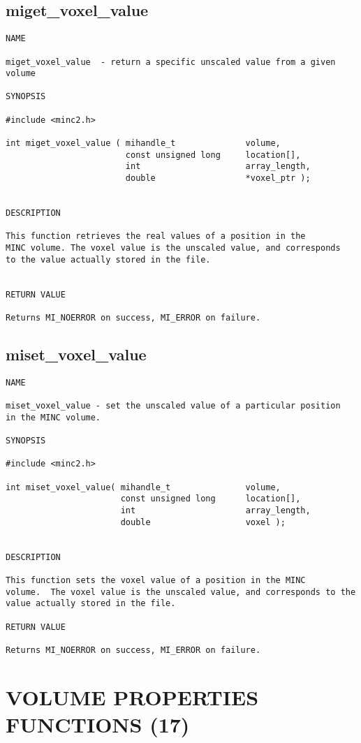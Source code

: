 \documentclass{article}
\begin{document}
\subsection{miget\_voxel\_value}
\begin{verbatim}
NAME

miget_voxel_value  - return a specific unscaled value from a given volume

SYNOPSIS

#include <minc2.h>

int miget_voxel_value ( mihandle_t              volume,
                        const unsigned long     location[],
                        int                     array_length,
                        double                  *voxel_ptr );


DESCRIPTION

This function retrieves the real values of a position in the
MINC volume. The voxel value is the unscaled value, and corresponds
to the value actually stored in the file.


RETURN VALUE

Returns MI_NOERROR on success, MI_ERROR on failure.
\end{verbatim}

\subsection{miset\_voxel\_value}
\begin{verbatim}
NAME

miset_voxel_value - set the unscaled value of a particular position
in the MINC volume.

SYNOPSIS

#include <minc2.h>

int miset_voxel_value( mihandle_t               volume,
                       const unsigned long      location[],
                       int                      array_length,
                       double                   voxel );


DESCRIPTION

This function sets the voxel value of a position in the MINC
volume.  The voxel value is the unscaled value, and corresponds to the
value actually stored in the file.

RETURN VALUE

Returns MI_NOERROR on success, MI_ERROR on failure.
\end{verbatim}

\section{VOLUME PROPERTIES FUNCTIONS (17)}
\end{document}
